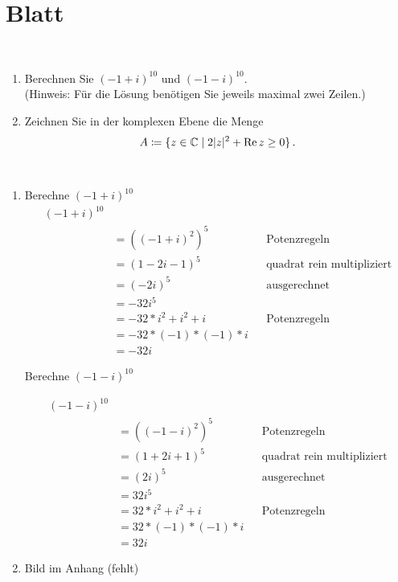 \section{Blatt}

\begin{aufg}[6 Punkte]\mbox{ }
\begin{enumerate}[label=$\mathrm{(\roman*)}$, ref=$\mathrm{\roman*}$]
\item Berechnen Sie $\left(-1+i \right)^{10}$ und $\left(-1-i \right)^{10}$. \\
(Hinweis: F\"ur die L\"osung ben\"otigen Sie jeweils maximal zwei Zeilen.)
\item Zeichnen Sie in der komplexen Ebene die Menge
\[
 A \coloneqq \{ z\in\mathbb{C} \mid 2|z|^2 + \operatorname{Re} z \geq 0\}\,.
\]
\end{enumerate}
\end{aufg}

\bigskip

\begin{lsg}\mbox{ }
\begin{enumerate}[label=$\mathrm{(\roman*)}$, ref=$\mathrm{\roman*}$]
\item Berechne $(-1 + i)^{10} $
\begin{align*}
(-1 + i)^{10}
\\
    & = ((-1 + i)^2)^5 && \text{Potenzregeln}
\\
& =(1 -2i -1)^5 && \text{quadrat rein multipliziert}
\\
& =(-2i)^5 && \text{ausgerechnet}
\\
& = -32i^5
\\
& = -32 * i^2 + i^2 +i && \text{Potenzregeln}
\\
& = -32 * (-1) * (-1) *i
\\
& = -32i
\end{align*}



Berechne $(-1 - i)^{10} $

\begin{align*}
(-1 - i)^{10}
\\
& = ((-1 - i)^2)^5 &&\text{Potenzregeln}
\\
& =(1 +2i +1)^5 &&\text{quadrat rein multipliziert}
\\
& =(2i)^5 &&\text{ausgerechnet}
\\
& = 32i^5
\\
& = 32 * i^2 + i^2 +i &&\text{Potenzregeln}
\\
& = 32 * (-1) *(-1) *i
\\
& = 32i
\end{align*}
%
\item Bild im Anhang (fehlt)
\end{enumerate}
\end{lsg}

